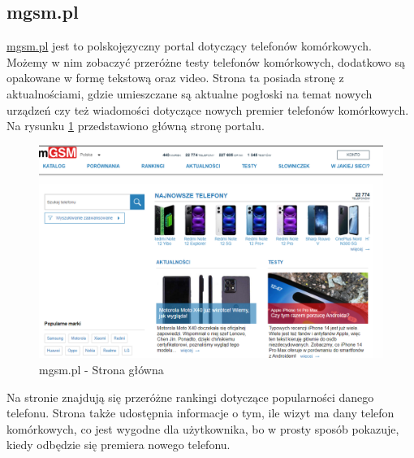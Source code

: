 \subsection{mgsm.pl}
\href{https://www.mgsm.pl/pl/}{mgsm.pl} \cite{mgsm} jest to polskojęzyczny portal dotyczący telefonów komórkowych. Możemy w nim zobaczyć przeróżne testy telefonów komórkowych, dodatkowo są opakowane w formę tekstową oraz video. Strona ta posiada stronę z aktualnościami, gdzie umieszczane są aktualne pogłoski na temat nowych urządzeń czy też wiadomości dotyczące nowych premier telefonów komórkowych.
Na rysunku \ref*{mgsm_1} przedstawiono główną stronę portalu.
\begin{figure}[H]
    \centering
    \includegraphics[scale=0.4]{img/mgsm/mgsm.png}
    \caption{mgsm.pl - Strona główna}
    \label{mgsm_1}
\end{figure}
Na stronie znajdują się przeróżne rankingi dotyczące popularności danego telefonu. Strona także udostępnia informacje o tym, ile wizyt ma dany telefon komórkowych, co jest wygodne dla użytkownika, bo w prosty sposób pokazuje, kiedy odbędzie się premiera nowego telefonu.

